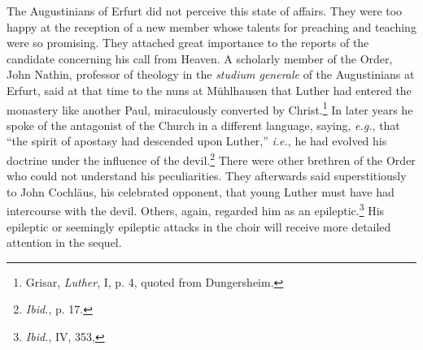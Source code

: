 The Augustinians of Erfurt did not perceive this state of affairs.
They were too happy at the reception of a new member whose
talents for preaching and teaching were so promising. They attached
great importance to the reports of the candidate concerning his call
from Heaven. A scholarly member of the Order, John Nathin,
professor of theology in the \textit{studium generale} of the Augustinians at
Erfurt, said at that time to the nuns at Mühlhausen that Luther
had entered the monastery like another Paul, miraculously converted by Christ.\footnote
{Grisar, \textit{Luther}, I, p. 4, quoted from Dungersheim.}
In later years he spoke of the antagonist of the
Church in a different language, saying, \textit{e.g.}, that “the spirit of
apostasy had descended upon Luther,” \textit{i.e.}, he had evolved his
doctrine under the influence of the devil.\footnote{\textit{Ibid.}, p. 17.}
There were other brethren of the Order who could not understand his peculiarities.
They afterwards said superstitiously to John Cochläus, his celebrated opponent,
that young Luther must have had intercourse with the devil. Others,
again, regarded him as an epileptic.\footnote{\textit{Ibid.}, IV, 353,}
His epileptic or seemingly epileptic attacks in the choir will receive more
detailed attention in the sequel.

